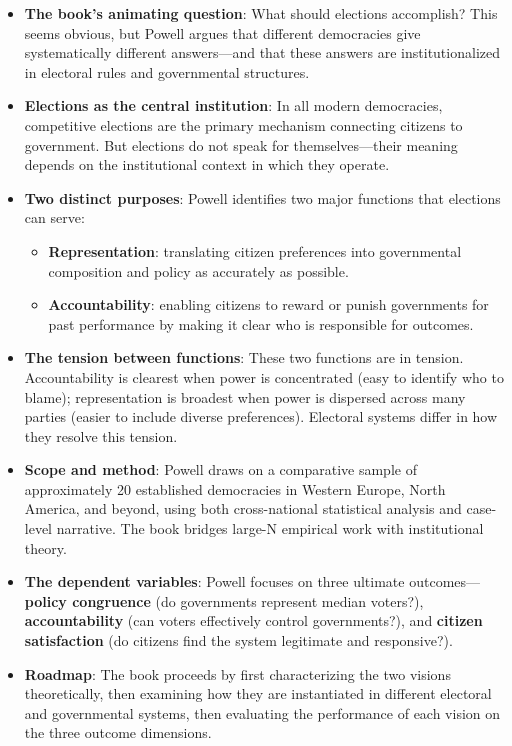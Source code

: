 \documentclass[12pt]{article}
\begin{document}
\begin{itemize}[leftmargin=*, itemsep=4pt]
    \item \textbf{The book's animating question}: What should elections accomplish? This seems obvious, but Powell argues that different democracies give systematically different answers---and that these answers are institutionalized in electoral rules and governmental structures.
    \item \textbf{Elections as the central institution}: In all modern democracies, competitive elections are the primary mechanism connecting citizens to government. But elections do not speak for themselves---their meaning depends on the institutional context in which they operate.
    \item \textbf{Two distinct purposes}: Powell identifies two major functions that elections can serve:
        \begin{itemize}
            \item \textbf{Representation}: translating citizen preferences into governmental composition and policy as accurately as possible.
            \item \textbf{Accountability}: enabling citizens to reward or punish governments for past performance by making it clear who is responsible for outcomes.
        \end{itemize}
    \item \textbf{The tension between functions}: These two functions are in tension. Accountability is clearest when power is concentrated (easy to identify who to blame); representation is broadest when power is dispersed across many parties (easier to include diverse preferences). Electoral systems differ in how they resolve this tension.
    \item \textbf{Scope and method}: Powell draws on a comparative sample of approximately 20 established democracies in Western Europe, North America, and beyond, using both cross-national statistical analysis and case-level narrative. The book bridges large-N empirical work with institutional theory.
    \item \textbf{The dependent variables}: Powell focuses on three ultimate outcomes---\textbf{policy congruence} (do governments represent median voters?), \textbf{accountability} (can voters effectively control governments?), and \textbf{citizen satisfaction} (do citizens find the system legitimate and responsive?).
    \item \textbf{Roadmap}: The book proceeds by first characterizing the two visions theoretically, then examining how they are instantiated in different electoral and governmental systems, then evaluating the performance of each vision on the three outcome dimensions.
\end{itemize}
\end{document}
